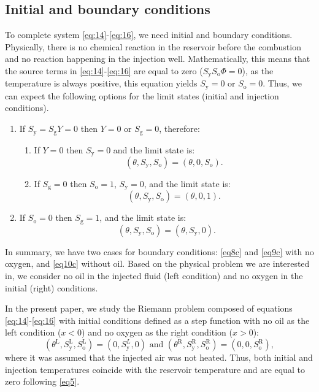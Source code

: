 \subsection{Initial and boundary conditions}
To complete system \eqref{eq:14}-\eqref{eq:16}, we need initial and boundary conditions. Physically, there is no chemical reaction in the reservoir before the combustion and no reaction happening in the injection well. Mathematically, this means that the source terms in \eqref{eq:14}-\eqref{eq:16} are equal to zero ($S_{\text{y}} S_{\text{o}} \Phi = 0$), as the temperature is always positive, this equation yields $S_{\text{y}} = 0$ or $S_{\text{o}} = 0$. Thus, we can expect the following options for the limit states (initial and injection conditions).
\begin{enumerate}
	\item If $S_{\text{y}}= S_\text{g} Y = 0$ then  $Y = 0$ or $S_\text{g} = 0$, therefore:
	      \begin{enumerate}
		      \item If $Y = 0$ then $S_{\text{y}} = 0$ and the limit state is:
		            \begin{equation}\label{eq8c}
			            (\theta,S_{\text{y}},S_{\text{o}}) = (\theta,0,S_{\text{o}}).
		            \end{equation}
		      \item If $S_\text{g} = 0$ then $S_{\text{o}} = 1$, $S_{\text{y}} = 0$, and the limit state is:
		            \begin{equation}\label{eq9c}
			            (\theta,S_{\text{y}},S_{\text{o}}) = (\theta,0,1).
		            \end{equation}
	      \end{enumerate}
	\item If $S_{\text{o}} = 0$ then $S_\text{g}=1$, and the limit state is:
	      \begin{equation}\label{eq10c}
		      (\theta,S_{\text{y}},S_{\text{o}}) = (\theta,S_{\text{y}},0).
	      \end{equation}
\end{enumerate}
In summary, we have two cases for boundary conditions: \eqref{eq8c} and \eqref{eq9c} with no oxygen, and \eqref{eq10c} without oil.
Based on the physical problem we are interested in, we consider no oil in the injected fluid (left condition) and no oxygen in the initial (right) conditions.

In the present paper, we study the Riemann problem composed of
equations \eqref{eq:14}-\eqref{eq:16} with initial conditions defined
as a step function with no oil as the left condition ($x<0$) and no
oxygen as the right condition ($x>0$):
\begin{equation}
	\label{eq:Riemann_boundary}
	(\theta^{\text{L}},S_{\text{y}}^{\text{L}},S_{\text{o}}^{\text{L}})=
	\left(0,S_{\text{y}}^L,0\right)
	\text{ and }
	\left(\theta^{\text{R}},S_{\text{y}}^{\text{R}},S_{\text{o}}^{\text{R}}\right)=
	\left(0,0,S_{\text{o}}^{\text{R}}\right),
\end{equation}
where it was assumed that the injected air was not heated.
Thus, both initial and injection temperatures coincide with the reservoir temperature and are equal to zero following \eqref{eq5}.
\cite{zavala2020classification}
